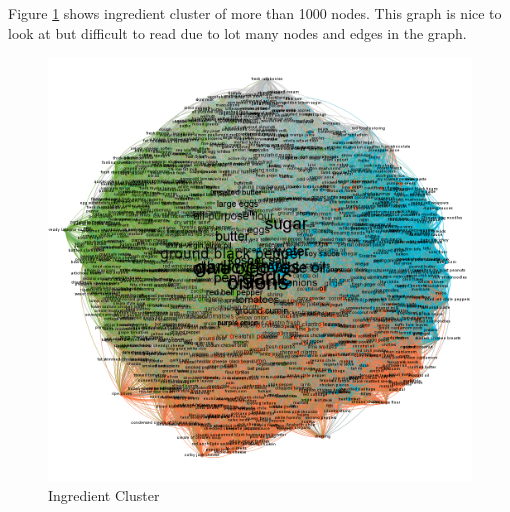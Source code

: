 \documentclass[sigconf]{acmart}
\begin{document}
Figure \ref{f:ingredient_modularity} shows ingredient cluster of more than 1000 nodes. This graph is nice to look at but difficult to read due to lot many nodes and edges in the graph. 
\begin{figure}[!ht]
  \centering\includegraphics[width=\columnwidth]{images/ingredient_modularity.png}
  \caption{Ingredient Cluster }\label{f:ingredient_modularity}
\end{figure}
\end{document}
